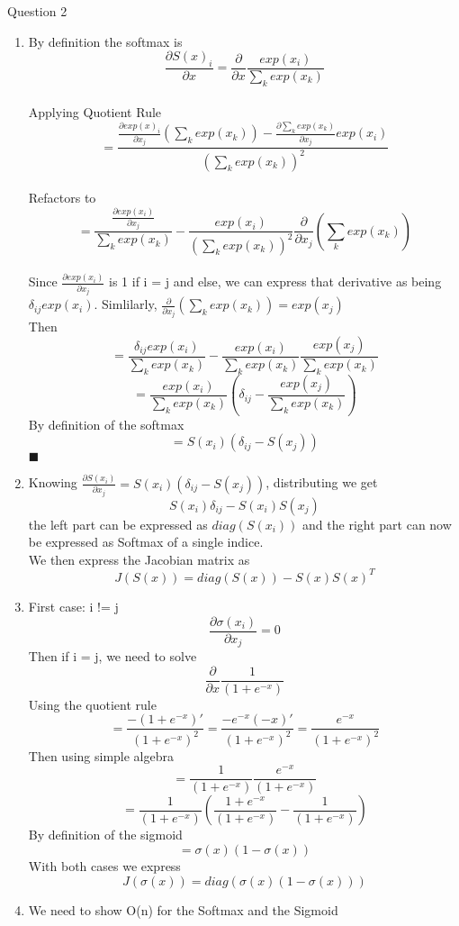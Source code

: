 \documentclass{article}
\begin{document}
 Question 2 \\
  \begin{enumerate}
  \item
	By definition the softmax is $$\frac{\partial S(x)_i}{\partial x} =  \frac{\partial }{\partial x} \frac{exp(x_i)}{\sum_k exp(x_k)}$$\\
	Applying Quotient Rule $$ = \frac{\frac{\partial exp(x)_i}{\partial x_j} (\sum_k exp(x_k)) -  \frac{\partial \sum_k exp(x_k)}{\partial x_j} exp(x_i)} {(\sum_k exp(x_k))^2} $$\\
	Refactors to $$= \frac{\frac{\partial exp(x_i)}{\partial x_j}}{\sum_k exp(x_k)} - \frac{exp(x_i)}{(\sum_k exp(x_k))^2} \frac{\partial }{\partial x_j} (\sum_k exp(x_k))$$\\
	Since $\frac{\partial exp(x_i)}{\partial x_j}$ is 1 if i = j and else, we can express that derivative as being $\delta_{ij}exp(x_i)$. Simlilarly,  $\frac{\partial }{\partial x_j} (\sum_k exp(x_k)) 		= exp(x_j) $\\
	Then $$ =\frac{\delta_{ij}exp(x_i)}{\sum_k exp(x_k)} - \frac{exp(x_i)}{\sum_k exp(x_k)} \frac{exp(x_j)}{\sum_k exp(x_k)} $$ $$=  \frac{exp(x_i)}{\sum_k exp(x_k)} (\delta_{ij} - 	        		           \frac{exp(x_j)}{\sum_k exp(x_k)}) $$
	By definition of the softmax $$ = S(x_i)(\delta_{ij} - S(x_j))$$
	$\blacksquare$

\item
	Knowing $\frac{\partial S(x_i)}{\partial x_j} = S(x_i)(\delta_{ij} - S(x_j))$, distributing we get $$ S(x_i)\delta_{ij} - S(x_i)S(x_j)$$ 
	the left part can be expressed as $diag(S(x_i))$ and the right part can now be expressed as Softmax of a single indice.\\
	We then express the Jacobian matrix as $$ J(S(x)) = diag(S(x)) - S(x)S(x)^T$$

\item
	First case: i != j   $$\frac{\partial \sigma(x_i)}{\partial x_j} = 0$$
	Then if i = j, we need to solve $$\frac{\partial }{\partial x}\frac{1}{(1 + e^{-x})}$$ Using the quotient rule $$ = \frac{- (1 + e^{-x})'}{(1 + e^{-x})^2} =
	\frac{- e^{-x}(-x)'}{(1 + e^{-x})^2} = \frac{e^{-x}}{(1 + e^{-x})^2} $$ Then using simple algebra $$ = \frac{1}{(1 + e^{-x})} \frac{e^{-x}}{(1 + e^{-x})}$$
	$$ = \frac{1}{(1 + e^{-x})} (\frac{1 + e^{-x} }{(1 + e^{-x})} - \frac{1}{(1 + e^{-x})})$$ By definition of the sigmoid $$ = \sigma(x)(1 - \sigma(x))$$
	With both cases we express $$J(\sigma(x)) = diag(\sigma(x)(1 - \sigma(x)))$$

\item 
	We need to show O(n) for the Softmax and the Sigmoid\\


\end{enumerate}
\end{document}
